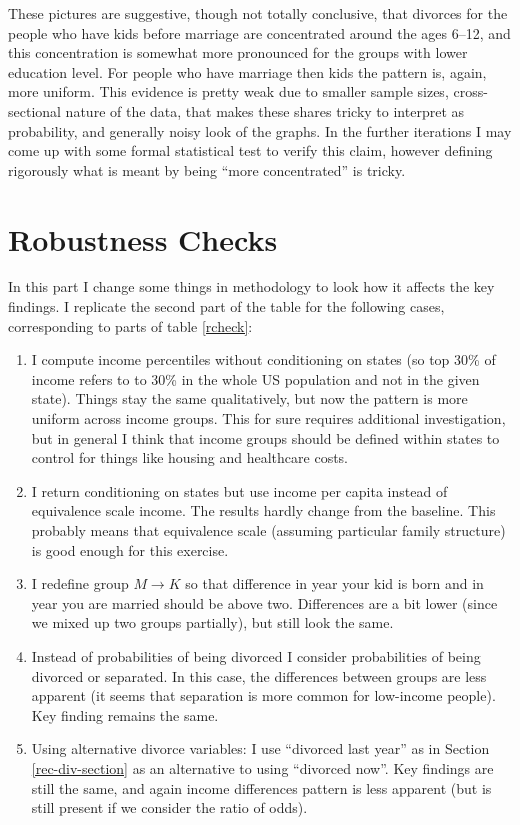 \documentclass[12pt,letter]{article}
\begin{document}
These pictures are suggestive, though not totally conclusive, that divorces for the people who have kids before marriage are concentrated around the ages 6--12, and this concentration is somewhat more pronounced for the groups with lower education level. For people who have marriage then kids the pattern is, again, more uniform. This evidence is pretty weak due to smaller sample sizes, cross-sectional nature of the data, that makes these shares tricky to interpret as probability, and generally noisy look of the graphs. In the further iterations I may come up with some formal statistical test to verify this claim, however defining rigorously what is meant by being ``more concentrated'' is tricky.




\section{Robustness Checks}
In this part I change some things in methodology to look how it affects the key findings. I replicate the second part of the table for the following cases, corresponding to parts of table \ref{rcheck}:
\begin{enumerate}
\item I compute income percentiles without conditioning on states (so top 30\% of income refers to to 30\% in the whole US population and not in the given state). Things stay the same qualitatively, but now the pattern is more uniform across income groups. This for sure requires additional investigation, but in general I think that income groups should be defined within states to control for things like housing and healthcare costs.
\item I return conditioning on states but use income per capita instead of equivalence scale income. The results hardly change from the baseline. This probably means that equivalence scale (assuming particular family structure) is good enough for this exercise.
\item I redefine group $M\to K$ so that difference in year your kid is born and in year you are married should be above two. Differences are a bit lower (since we mixed up two groups partially), but still look the same.
\item Instead of probabilities of being divorced I consider probabilities of being divorced or separated. In this case, the differences between groups are less apparent (it seems that separation is more common for low-income people). Key finding remains the same.
\item Using alternative divorce variables: I use ``divorced last year'' as in Section \ref{rec-div-section} as an alternative to using ``divorced now''. Key findings are still the same, and again income differences pattern is less apparent (but is still present if we consider the ratio of odds).
\end{enumerate}
\end{document}
